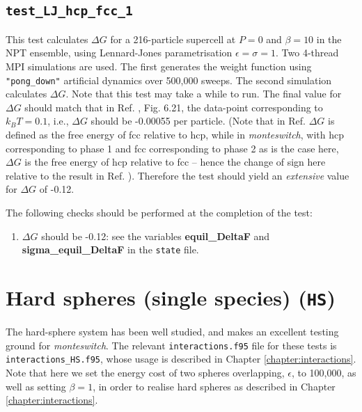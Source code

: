 \documentclass{report}
\begin{document}
\subsection{\texttt{test\_LJ\_hcp\_fcc\_1}}
This test calculates $\Delta G$ for a 216-particle supercell at $P=0$ and $\beta=10$ in the NPT ensemble, using Lennard-Jones 
parametrisation $\epsilon=\sigma=1$. Two 4-thread MPI simulations are used. The first generates the weight function using 
\texttt{"pong\_down"} artificial dynamics over 500,000 sweeps. The second simulation calculates $\Delta G$. Note that this 
test may take a while to run. The final value for $\Delta G$ should match that in Ref. \cite{thesis:Jackson}, Fig. 6.21, 
the data-point corresponding to $k_BT=0.1$, i.e., $\Delta G$ should be -0.00055 per particle. (Note that in Ref. \cite{thesis:Jackson} 
$\Delta G$ is defined as the free energy of fcc relative to hcp, while in \emph{monteswitch}, with hcp corresponding to 
phase 1 and fcc corresponding to phase 2 as is the case here, $\Delta G$ is the free energy of hcp relative to fcc -- hence 
the change of sign here relative to the result in Ref. \cite{thesis:Jackson}). Therefore the test should yield an \emph{extensive} 
value for $\Delta G$ of -0.12.

The following checks should be performed at the completion of the test:
\begin{enumerate}
\item
$\Delta G$ should be -0.12: see the variables \textbf{equil\_DeltaF} and \textbf{sigma\_equil\_DeltaF} in the \texttt{state} file.
\end{enumerate}


\section{Hard spheres (single species) (\texttt{HS})}
The hard-sphere system has been well studied, and makes an excellent testing ground for \emph{monteswitch}.
The relevant \texttt{interactions.f95} file for these tests is \texttt{interactions\_HS.f95}, whose usage is described in Chapter
\ref{chapter:interactions}. Note that here we set the energy cost of two spheres overlapping,
$\epsilon$, to 100,000, as well as setting $\beta=1$, in order to realise hard spheres as described in Chapter \ref{chapter:interactions}.
\end{document}
